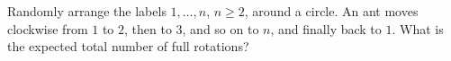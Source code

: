 Randomly arrange the labels $1,\ldots,n$, $n\ge2$, around a circle. An ant moves clockwise from $1$ to $2$, then to $3$, and so on to $n$, and finally back to $1$. What is the expected total number of full rotations?
